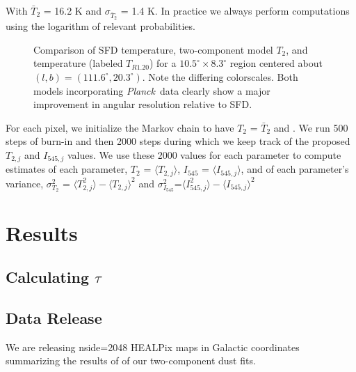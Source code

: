\documentclass{emulateapj}
\newcommand{\PLANCK}{{\it Planck}}
\begin{document}
With $\bar{T}_2$ = 16.2 K and $\sigma_{\bar{T}_2}$ = 1.4 K. In practice we 
always perform computations using the logarithm of relevant probabilities.

\begin{figure}
\begin{center}
\caption{\label{fig:comparison} Comparison of SFD temperature, two-component 
model $T_2$, and \cite{planckdust} temperature (labeled $T_{R1.20}$) for a
 $10.5^{\circ}\times8.3^{\circ}$  region centered about 
$(l,b) = (111.6^{\circ}, 20.3^{\circ})$. Note the 
differing colorscales. Both models incorporating \PLANCK~data clearly show a 
major improvement in angular resolution relative to SFD.}
\end{center}
\end{figure}

For each pixel, we initialize the Markov chain to have $T_2$ = $\bar{T}_2$ and
. We run 500 steps of burn-in and then 2000 steps during which we keep track
of the proposed $T_{2, j}$ and $I_{545, j}$ values. We use these 2000 values 
for each parameter to compute estimates of each parameter,  $T_2$ = 
$\langle T_{2, j} \rangle$, $I_{545}$ = $\langle I_{545, j} \rangle$, and of 
each parameter's variance, $\sigma^2_{T_2}$ = $\langle T^2_{2, j} \rangle-\langle T_{2, j} \rangle ^2$ and $\sigma^2_{I_{545}}$=$\langle I^2_{545, j} 
\rangle-\langle I_{545, j} \rangle ^2$

\section{Results}
\label{sec:results}

\subsection{Calculating $\tau$}


\subsection{Data Release}
We are releasing nside=2048 HEALPix maps in Galactic coordinates summarizing 
the results of of our two-component dust fits.
\end{document}
